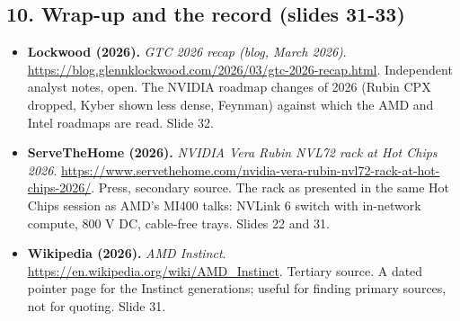 \documentclass[11pt,letterpaper]{article}
\begin{document}
\subsection*{10. Wrap-up and the record (slides 31-33)}
\begin{itemize}[leftmargin=1.2em,itemsep=3pt]\sloppy
\item \textbf{Lockwood (2026).} \textit{GTC 2026 recap (blog, March 2026)}. \url{https://blog.glennklockwood.com/2026/03/gtc-2026-recap.html}. Independent analyst notes, open. The NVIDIA roadmap changes of 2026 (Rubin CPX dropped, Kyber shown less dense, Feynman) against which the AMD and Intel roadmaps are read. Slide 32.
\item \textbf{ServeTheHome (2026).} \textit{NVIDIA Vera Rubin NVL72 rack at Hot Chips 2026}. \url{https://www.servethehome.com/nvidia-vera-rubin-nvl72-rack-at-hot-chips-2026/}. Press, secondary source. The rack as presented in the same Hot Chips session as AMD's MI400 talks: NVLink 6 switch with in-network compute, 800 V DC, cable-free trays. Slides 22 and 31.
\item \textbf{Wikipedia (2026).} \textit{AMD Instinct}. \url{https://en.wikipedia.org/wiki/AMD_Instinct}. Tertiary source. A dated pointer page for the Instinct generations; useful for finding primary sources, not for quoting. Slide 31.
\end{itemize}
\clearpage
\printindex
\end{document}
